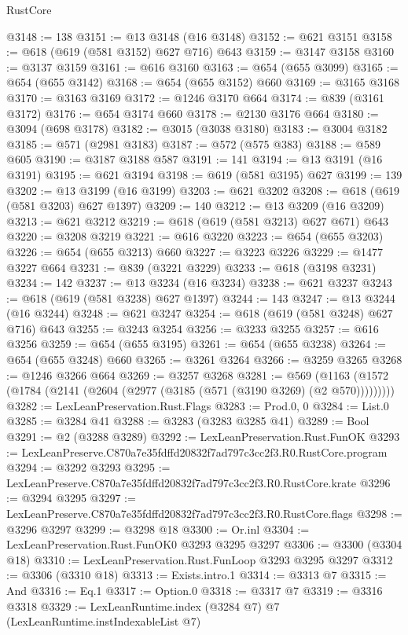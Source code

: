 \begin{lexlean}{RustCore}
\begin{coremodule}
@3148 := 138
@3151 := @13 @3148 (@16 @3148)
@3152 := @621 @3151
@3158 := @618 (@619 (@581 @3152) @627 @716) @643
@3159 := @3147 @3158
@3160 := @3137 @3159
@3161 := @616 @3160
@3163 := @654 (@655 @3099)
@3165 := @654 (@655 @3142)
@3168 := @654 (@655 @3152) @660
@3169 := @3165 @3168
@3170 := @3163 @3169
@3172 := @1246 @3170 @664
@3174 := @839 (@3161 @3172)
@3176 := @654 @3174 @660
@3178 := @2130 @3176 @664
@3180 := @3094 (@698 @3178)
@3182 := @3015 (@3038 @3180)
@3183 := @3004 @3182
@3185 := @571 (@2981 @3183)
@3187 := @572 (@575 @383)
@3188 := @589 @605
@3190 := @3187 @3188 @587
@3191 := 141
@3194 := @13 @3191 (@16 @3191)
@3195 := @621 @3194
@3198 := @619 (@581 @3195) @627
@3199 := 139
@3202 := @13 @3199 (@16 @3199)
@3203 := @621 @3202
@3208 := @618 (@619 (@581 @3203) @627 @1397)
@3209 := 140
@3212 := @13 @3209 (@16 @3209)
@3213 := @621 @3212
@3219 := @618 (@619 (@581 @3213) @627 @671) @643
@3220 := @3208 @3219
@3221 := @616 @3220
@3223 := @654 (@655 @3203)
@3226 := @654 (@655 @3213) @660
@3227 := @3223 @3226
@3229 := @1477 @3227 @664
@3231 := @839 (@3221 @3229)
@3233 := @618 (@3198 @3231)
@3234 := 142
@3237 := @13 @3234 (@16 @3234)
@3238 := @621 @3237
@3243 := @618 (@619 (@581 @3238) @627 @1397)
@3244 := 143
@3247 := @13 @3244 (@16 @3244)
@3248 := @621 @3247
@3254 := @618 (@619 (@581 @3248) @627 @716) @643
@3255 := @3243 @3254
@3256 := @3233 @3255
@3257 := @616 @3256
@3259 := @654 (@655 @3195)
@3261 := @654 (@655 @3238)
@3264 := @654 (@655 @3248) @660
@3265 := @3261 @3264
@3266 := @3259 @3265
@3268 := @1246 @3266 @664
@3269 := @3257 @3268
@3281 := @569 (@1163 (@1572 (@1784 (@2141 (@2604 (@2977 (@3185 (@571 (@3190 @3269) (@2 @570)))))))))
@3282 := LexLeanPreservation.Rust.Flags
@3283 := Prod.{0, 0}
@3284 := List.{0}
@3285 := @3284 @41
@3288 := @3283 (@3283 @3285 @41)
@3289 := Bool
@3291 := @2 (@3288 @3289)
@3292 := LexLeanPreservation.Rust.FunOK
@3293 := LexLeanPreserve.C870a7e35fdffd20832f7ad797c3cc2f3.R0.RustCore.program
@3294 := @3292 @3293
@3295 := LexLeanPreserve.C870a7e35fdffd20832f7ad797c3cc2f3.R0.RustCore.krate
@3296 := @3294 @3295
@3297 := LexLeanPreserve.C870a7e35fdffd20832f7ad797c3cc2f3.R0.RustCore.flags
@3298 := @3296 @3297
@3299 := @3298 @18
@3300 := Or.inl
@3304 := LexLeanPreservation.Rust.FunOK0 @3293 @3295 @3297
@3306 := @3300 (@3304 @18)
@3310 := LexLeanPreservation.Rust.FunLoop @3293 @3295 @3297
@3312 := @3306 (@3310 @18)
@3313 := Exists.intro.{1}
@3314 := @3313 @7
@3315 := And
@3316 := Eq.{1}
@3317 := Option.{0}
@3318 := @3317 @7
@3319 := @3316 @3318
@3329 := LexLeanRuntime.index
    (@3284 @7)
    @7
    (LexLeanRuntime.instIndexableList @7)

\end{coremodule}
\end{lexlean}
